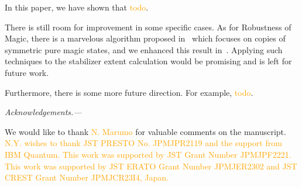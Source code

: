 \documentclass[a4paper, onecolumn, 11pt, longbibliography]{quantumarticle}
\newcommand{\orange}[1]{\textcolor{orange}{#1}}
\begin{document}
In this paper, we have shown that \orange{todo}.

There is still room for improvement
in some specific cases.
As for Robustness of Magic,
there is a marvelous algorithm
proposed in~\cite{Heinrich2019robustnessofmagic}
which focuses on copies of symmetric pure magic states,
and we enhanced this result in~\cite{hamaguchiHandbookEfficientlyQuantifying2023}.
Applying such techniques to the stabilizer extent calculation
would be promising and is left for future work.

Furthermore, there is some more future direction.
For example, \orange{todo}.

\emph{Acknowledgements.---}

We would like to thank \orange{N. Marumo} for valuable comments on the manuscript.
\orange{N.Y. wishes to thank JST PRESTO No. JPMJPR2119 and the support
  from IBM Quantum. This work was supported by JST Grant Number JPMJPF2221.
  This work was supported by JST ERATO Grant Number JPMJER2302 and JST CREST
  Grant Number JPMJCR23I4, Japan.}




\appendix




\end{document}
